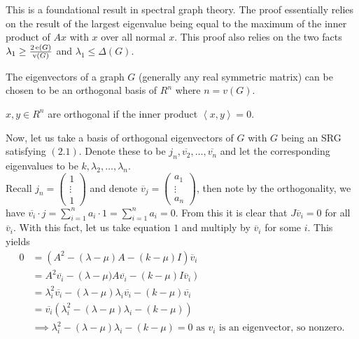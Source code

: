 This is a foundational result in spectral graph theory. The proof essentially relies on the result of the largest eigenvalue being equal to the maximum of the inner product of \(Ax\) with \(x\) over all normal \(x\). This proof also relies on the two facts \(\lambda_1 \ge \frac{2\operatorname{e}\left( G \right) }{\operatorname{v}\left( G \right) }\) and \(\lambda_1 \le \Delta \left( G \right) \).
\begin{proposition}
	The eigenvectors of a graph \(G\) (generally any real symmetric matrix) can be chosen to be an orthogonal basis of \(R^{n}\) where \(n = v\left( G \right) \).
\end{proposition}
\begin{recall}
	\(x, y \in R^{n}\) are orthogonal if the inner product \(\left<x, y \right> = 0\).
\end{recall}
Now, let us take a basis of orthogonal eigenvectors of \(G\) with \(G\) being an SRG satisfying \(\left( 2.1 \right) \). Denote these to be \(j_{n}, \overline{v_2}, \ldots, \overline{v_{n}}\) and let the corresponding eigenvalues to be \(k, \lambda_2, \ldots, \lambda_{n}\).
\\
Recall \(j_{n} = \begin{pmatrix} 1\\ \vdots\\ 1 \end{pmatrix}\) and denote \(\overline{v}_{j} = \begin{pmatrix} a_1\\ \vdots\\ a_n \end{pmatrix}\), then note by the orthogonality, we have \(\overline{v_{i}} \cdot j = \sum_{i= 1}^{n} a_{i} \cdot 1 = \sum_{i= 1}^{n} a_{i} = 0\). From this it is clear that \(J \overline{v}_{i} = 0\) for all \(\overline{v}_{i}\). With this fact, let us take equation \( 1\) and multiply by \(\overline{v}_{i}\) for some \(i\). This yields \begin{align*}
0 &= \left( A^2 - \left( \lambda - \mu \right) A - \left( k - \mu \right) I \right) \overline{v}_{i} \\
&= A^2\overline{v_{i}} - \left( \lambda - \mu)A \overline{v_{i}}- \left( k - \mu \right) I\overline{v}_{i} \right) \\
&= \lambda_{i}^2 \overline{v_{i}}- \left( \lambda - \mu \right) \lambda_{i} \overline{v_{i}}  - \left( k - \mu \right) \overline{v_{i}} \\
&= \overline{v_{i}}\left( \lambda_{i}^2 - \left( \lambda - \mu \right) \lambda_{i}  - \left( k - \mu \right) \right) \\
&\implies \lambda_{i}^2 - \left( \lambda - \mu \right) \lambda_{i} - \left( k - \mu \right) = 0 \text{ as \(v_{i}\) is an eigenvector, so nonzero}
.\end{align*}
